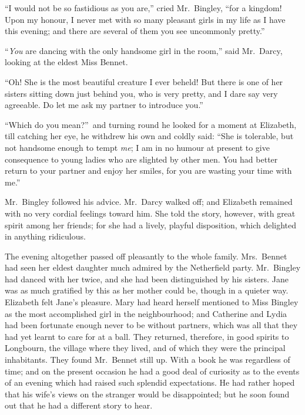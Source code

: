 \documentclass[12pt,english,oneside]{book}
\begin{document}
{}``I would not be so fastidious as you are,'' cried Mr.\ Bingley,
{}``for a kingdom! Upon my honour, I never met with so many pleasant
girls in my life as I have this evening; and there are several of
them you see uncommonly pretty.''

{}``\textit{You} are dancing with the only handsome girl in the room,''
said Mr.\ Darcy, looking at the eldest Miss Bennet.

{}``Oh! She is the most beautiful creature I ever beheld! But there
is one of her sisters sitting down just behind you, who is very pretty,
and I dare say very agreeable. Do let me ask my partner to introduce
you.''

{}``Which do you mean?''\ and turning round he looked for a moment
at Elizabeth, till catching her eye, he withdrew his own and coldly
said: {}``She is tolerable, but not handsome enough to tempt \textit{me};
I am in no humour at present to give consequence to young ladies who
are slighted by other men. You had better return to your partner and
enjoy her smiles, for you are wasting your time with me.''

Mr.\ Bingley followed his advice. Mr.\ Darcy walked off; and Elizabeth
remained with no very cordial feelings toward him. She told the story,
however, with great spirit among her friends; for she had a lively,
playful disposition, which delighted in anything ridiculous.

The evening altogether passed off pleasantly to the whole family.
Mrs.\ Bennet had seen her eldest daughter much admired by the Netherfield
party. Mr.\ Bingley had danced with her twice, and she had been distinguished
by his sisters. Jane was as much gratified by this as her mother could
be, though in a quieter way. Elizabeth felt Jane's pleasure. Mary
had heard herself mentioned to Miss Bingley as the most accomplished
girl in the neighbourhood; and Catherine and Lydia had been fortunate
enough never to be without partners, which was all that they had yet
learnt to care for at a ball. They returned, therefore, in good spirits
to Longbourn, the village where they lived, and of which they were
the principal inhabitants. They found Mr.\ Bennet still up. With
a book he was regardless of time; and on the present occasion he had
a good deal of curiosity as to the events of an evening which had
raised such splendid expectations. He had rather hoped that his wife's
views on the stranger would be disappointed; but he soon found out
that he had a different story to hear.
\end{document}
